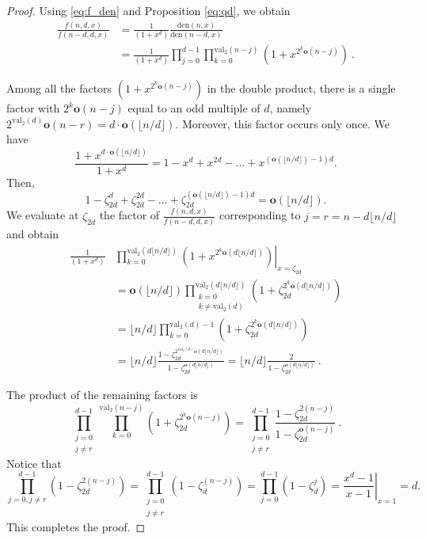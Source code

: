 \documentclass[reqno]{amsart}
\def\den{\mathrm{den}}
\def\val{\mathrm{val}}
\def\o{\mathbf o}
\theoremstyle{definition}
\begin{document}
\begin{proof} Using  \eqref{eq:f_den} and Proposition \ref{eq:qd}, we obtain
\begin{align*}
  \frac{f(n,d,x)}{f(n-d,d,x)}& =\frac{1}{(1+x^d)}\frac{\den(n,x)}{\den(n-d,x)}\\
    & = \frac{1}{(1+x^d)}\prod_{j=0}^{d-1}\prod_{k=0}^{\val_2(n-j)}(1+x^{2^k\o(n-j)})\: .
\end{align*}

 Among all  the factors $(1+x^{2^k\o(n-j)})$ in the double product, there is a single factor  with $2^k\o(n-j)$ equal to an odd multiple of $d$, namely  $2^{\val_2(d)}\o(n-r) =d\cdot\o(\lfloor n/d\rfloor)$. Moreover, this factor occurs  only once. We have
\[
\frac{1+x^{d\cdot\o(\lfloor n/d\rfloor)}}{1+x^d}=1-x^d+x^{2d}-\dots +x^{(\o(\lfloor n/d\rfloor)-1)d}.
\]
 Then, $$1-\zeta_{2d}^d+\zeta_{2d}^{2d}-\dots +\zeta_{2d}^{(\o(\lfloor n/d\rfloor)-1)d}=\o(\lfloor n/d\rfloor).$$ We evaluate at $\zeta_{2d}$ the  factor of  $ \frac{f(n,d,x)}{f(n-d,d,x)}$ corresponding to  $j=r=n-d\lfloor n/d\rfloor$ and obtain
\begin{align*}
\frac{1}{(1+x^d)} &  \left. 
\prod_{k=0}^{\val_2(d\lfloor{n}/{d}\rfloor)}(1+x^{2^k\o(d\lfloor{n}/{d}\rfloor)})\right|_{x=\zeta_{2d}} \\ &  =\o(\lfloor n/d\rfloor) \prod_{\substack{k=0\\ k\neq \val_2(d)}}^{\val_2(d\lfloor{n}/{d}\rfloor)}(1+\zeta_{2d}^{2^k\o(d\lfloor{n}/{d}\rfloor)})\\ & 
=\lfloor n/d\rfloor \prod_{k=0}^{\val_2(d)-1}(1+\zeta_{2d}^{2^k\o(d\lfloor{n}/{d}\rfloor)})\\ & = \lfloor n/d\rfloor\frac{1-\zeta_{2d}^{2^{\val_2(d)}\o(d\lfloor n/d\rfloor)}}{1-\zeta_{2d}^{\o(d\lfloor n/d\rfloor)}}=\lfloor n/d\rfloor\frac{2}{1-\zeta_{2d}^{\o(d\lfloor n/d\rfloor)}}\:.
\end{align*}

The product of the remaining factors is \[\prod_{\substack{j=0\\ j\neq r}}^{d-1}\prod_{k=0}^{\val_2(n-j)}(1+\zeta_{2d}^{2^k\o(n-j)})=\prod_{\substack{j=0\\ j\neq r}}^{d-1}\frac{1-\zeta_{2d}^{2(n-j)}}{1-\zeta_{2d}^{\o(n-j)}}\:.  \]
Notice that $$\prod_{j=0, j\neq r}^{d-1}{(1-\zeta_{2d}^{2(n-j)})}=\prod_{\substack{j=0\\ j\neq r}}^{d-1}{(1-\zeta_{d}^{(n-j)})}=\prod_{j=0}^{d-1}(1-\zeta_{d}^{j})=\left.\frac{x^d-1}{x-1}\right|_{x=1}=d.$$ 
This completes the proof. 
\end{proof}
\end{document}
